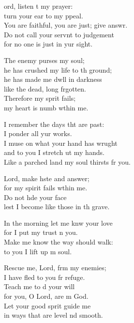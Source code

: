 \begin{psalmverse}
  \begin{patverse}
    ord, listen t my prayer:\Med\\
    turn your ear to my ppeal.\\
    You are faithful, you are just; give answr.\Flex\\
    Do not call your servnt to judgement\\
    for no one is just in yur sight.

    The enemy purses my soul;\Med\\
    he has crushed my life to th ground;\\
    he has made me dwll in darkness\Med\\
    like the dead, long frgotten.\\
    Therefore my sp\pointup{\i}rit fails;\Med\\
    my heart is numb w\pointup{\i}thin me.

    I remember the days tht are past:\Med\\
    I ponder all yur works.\\
    I muse on what your hand has wrught\Flex\\
    and to you I stretch ut my hands.\Med\\
    Like a parched land my soul thirsts fr you.

    Lord, make hste and answer;\Med\\
    for my spirit fails w\pointup{\i}thin me.\\
    Do not h\pointup{\i}de your face\Med\\
    lest I become like those in th grave.

    In the morning let me knw your love\Med\\
    for I put my trust \pointup{\i}n you.\\
    Make me know the way  should walk:\Med\\
    to you I lift up m soul.

    Rescue me, Lord, frm my enemies;\Med\\
    I have fled to you fr refuge.\\
    Teach me to d your will\Med\\
    for you, O Lord, are m God.\\
    Let your good sp\pointup{\i}rit guide me\Med\\
    in ways that are level nd smooth.


\end{patverse}
\end{psalmverse}
